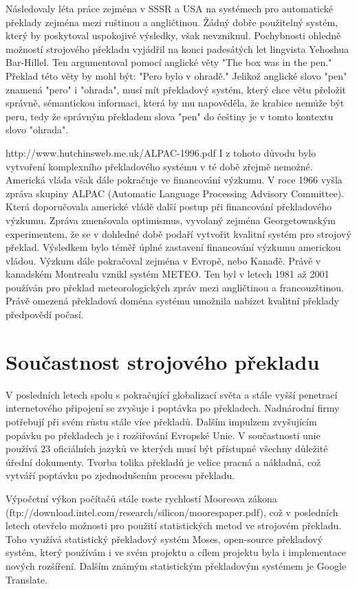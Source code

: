 Následovaly léta práce zejména v SSSR a USA na systémech pro automatické překlady zejména mezi ruštinou a angličtinou. Žádný dobře použitelný systém, který by poskytoval uspokojivé výsledky, však nevzniknul. Pochybnosti ohledně možností strojového překladu vyjádřil na konci padesátých let lingvista Yehoshua Bar-Hillel. Ten argumentoval pomocí anglické věty "The box was in the pen." Překlad této věty by mohl být: "Pero bylo v ohradě." Jelikož anglické slovo "pen" znamená "pero" i "ohrada", musí mít překladový systém, který chce větu přeložit správně, sémantickou informaci, která by mu napověděla, že krabice nemůže být peru, tedy že správným překladem slova "pen" do češtiny je v tomto kontextu slovo "ohrada".

http://www.hutchinsweb.me.uk/ALPAC-1996.pdf
I z tohoto důvodu bylo vytvoření komplexního překladového systému v té době zřejmě nemožné. Americká vláda však dále pokračuje ve financování výzkumu. V roce 1966 vyšla zpráva skupiny ALPAC (Automatic Language Processing Advisory Committee). Která doporučovala americké vládě další postup při financování překladového výzkumu. Zpráva zmenšovala optimismus, vyvolaný zejména Georgetownským experimentem, že se v dohledné době podaří vytvořit kvalitní systém pro strojový překlad. Výsledkem bylo téměř úplné zastavení financování výzkumu americkou vládou. Výzkum dále pokračoval zejména v Evropě, nebo Kanadě. Právě v kanadském Montrealu vznikl systém METEO. Ten byl v letech 1981 až 2001 používán pro překlad meteorologických zpráv mezi angličtinou a francouzštinou. Právě omezená překladová doména systému umožnila nabízet kvalitní překlady předpovědí počasí.


\section{Součastnost strojového překladu}
V posledních letech spolu s pokračující globalizací světa a stále vyšší penetrací internetového připojení se zvyšuje i poptávka po překladech. Nadnárodní firmy potřebují při svém růstu stále více překladů. Dalším impulzem zvyšujícím popávku po překladech je i rozšiřování Evropské Unie. V součastnosti unie používá 23 oficiálních jazyků ve kterých musí být přístupné všechny důležité úřední dokumenty. Tvorba tolika překladů je velice pracná a nákladná, což vytváří poptávku po zjednodušením procesu překladu.

Výpočetní výkon počítačů stále roste rychlostí Mooreova zákona (ftp://download.intel.com/research/silicon/moorespaper.pdf), což v posledních letech otevřelo možnosti pro použití statistických metod ve strojovém překladu. Toho využívá statistický překladový systém Moses, open-source překladový systém, který používám i ve svém projektu a cílem projektu byla i implementace nových rozšíření. Dalším známým statistickým překladovým systémem je Google Translate.

